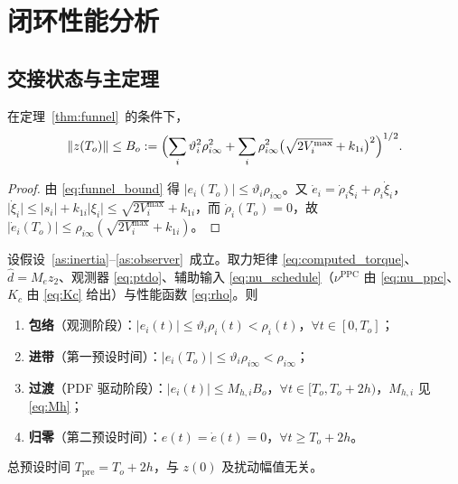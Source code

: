 \section{闭环性能分析}
\label{sec:analysis}

\subsection{交接状态与主定理}
\label{sec:main}

\begin{lemma}[交接状态有界]\label{lem:handover}
在定理~\ref{thm:funnel}~的条件下，
\begin{equation}
\lVert z(T_o)\rVert\le B_o:=\Bigl(\sum_{i}\vartheta_i^2\rho_{i\infty}^{2}
+\sum_{i}\rho_{i\infty}^{2}\bigl(\sqrt{2V_i^{\max}}+k_{1i}\bigr)^{2}\Bigr)^{1/2}.
\label{eq:B_o}
\end{equation}
\end{lemma}

\begin{proof}
由 \eqref{eq:funnel_bound} 得 \(\lvert e_i(T_o)\rvert\le\vartheta_i\rho_{i\infty}\)。又 \(\dot e_i=\dot\rho_i\xi_i+\rho_i\dot\xi_i\)，\(\lvert\dot\xi_i\rvert\le\lvert s_i\rvert+k_{1i}\lvert\xi_i\rvert\le\sqrt{2V_i^{\max}}+k_{1i}\)，而 \(\dot\rho_i(T_o)=0\)，故 \(\lvert\dot e_i(T_o)\rvert\le\rho_{i\infty}(\sqrt{2V_i^{\max}}+k_{1i})\)。
\end{proof}

\begin{theorem}[双重预设时间跟踪]\label{thm:main}
设假设~\ref{as:inertia}--\ref{as:observer}~成立。取力矩律 \eqref{eq:computed_torque}、\(\hat d=M_ez_2\)、观测器 \eqref{eq:ptdo}、辅助输入 \eqref{eq:nu_schedule}（\(\nu^{\mathrm{PPC}}\) 由 \eqref{eq:nu_ppc}、\(K_c\) 由 \eqref{eq:Kc} 给出）与性能函数 \eqref{eq:rho}。则
\begin{enumerate}
  \item[(i)] \textbf{包络}（观测阶段）：\(\lvert e_i(t)\rvert\le\vartheta_i\rho_i(t)<\rho_i(t)\)，\(\forall t\in[0,T_o]\)；
  \item[(ii)] \textbf{进带}（第一预设时间）：\(\lvert e_i(T_o)\rvert\le\vartheta_i\rho_{i\infty}<\rho_{i\infty}\)；
  \item[(iii)] \textbf{过渡}（PDF 驱动阶段）：\(\lvert e_i(t)\rvert\le M_{h,i}B_o\)，\(\forall t\in[T_o,T_o+2h)\)，\(M_{h,i}\) 见 \eqref{eq:Mh}；
  \item[(iv)] \textbf{归零}（第二预设时间）：\(e(t)=\dot e(t)=0\)，\(\forall t\ge T_o+2h\)。
\end{enumerate}
总预设时间 \(T_{\mathrm{pre}}=T_o+2h\)，与 \(z(0)\) 及扰动幅值无关。
\end{theorem}

